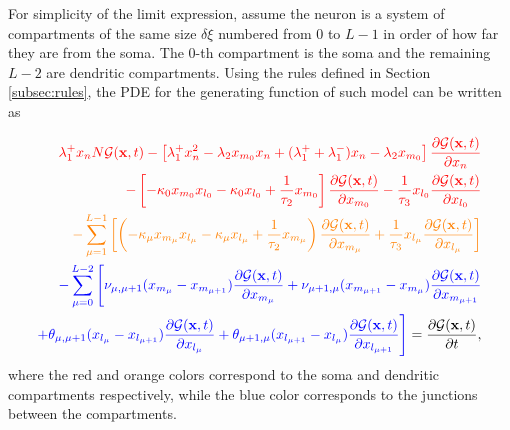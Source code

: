 \documentclass[a4paper, 11pt]{article}
\begin{document}

For simplicity of the limit expression, assume the neuron is a system of compartments of the same size $\delta\xi$ numbered from $0$ to $L-1$ in order of how far they are from the soma. The 0-th compartment is the soma and the remaining $L-2$ are dendritic compartments. Using the rules defined in Section \ref{subsec:rules}, the PDE for the generating function of such model can be written as

\begin{equation}
  \begin{split}
    \textcolor{red}{\lambda_1^+x_nN\mathcal G(\mathbf x, t)
    - \left[\lambda_1^+x_n^2 - \lambda_2x_{m_0}x_n + (\lambda_1^++\lambda_1^-)x_n-\lambda_2x_{m_0}\right]\frac{\partial\mathcal G(\mathbf x, t)}{\partial x_n}}\\
    \textcolor{red}{- \left[-\kappa_0x_{m_0}x_{l_0} - \kappa_0x_{l_0} + \frac{1}{\tau_2}x_{m_0}\right]\frac{\partial\mathcal G(\mathbf x, t)}{\partial x_{m_0}}
      -\frac{1}{\tau_3}x_{l_0}\frac{\partial\mathcal G(\mathbf x, t)}{\partial x_{l_0}}}\\
    \textcolor{orange}{-\sum_{\mu=1}^{L-1}\left[\left(-\kappa_{\mu}x_{m_{\mu}}x_{l_{\mu}} - \kappa_{\mu}x_{l_{\mu}} + \frac{1}{\tau_2}x_{m_{\mu}}\right)\frac{\partial \mathcal G(\mathbf x, t)}{\partial x_{m_{\mu}}} + \frac{1}{\tau_3}x_{l_{\mu}}\frac{\partial\mathcal G(\mathbf x, t)}{\partial x_{l_{\mu}}}\right]}\\
    \textcolor{blue}{-\sum_{\mu=0}^{L-2}\Bigg[\nu_{\mu,\mu+1}(x_{m_\mu}-x_{m_{\mu+1}})\frac{\partial\mathcal G(\mathbf x, t)}{\partial x_{m_\mu}} + \nu_{\mu+1,\mu}(x_{m_{\mu+1}}-x_{m_\mu})\frac{\partial\mathcal G(\mathbf x, t)}{\partial x_{m_{\mu+1}}} } \\
      \textcolor{blue}{+\theta_{\mu,\mu+1}(x_{l_\mu}-x_{l_{\mu+1}})\frac{\partial\mathcal G(\mathbf x, t)}{\partial x_{l_\mu}} + \theta_{\mu+1,\mu}(x_{l_{\mu+1}}-x_{l_\mu})\frac{\partial\mathcal G(\mathbf x, t)}{\partial x_{l_{\mu+1}}}\Bigg]}=\frac{\partial\mathcal G(\mathbf x, t)}{\partial t},
  \end{split}
\end{equation}
where the red and orange colors correspond to the soma and dendritic compartments respectively, while the blue color corresponds to the junctions between the compartments.
\end{document}
